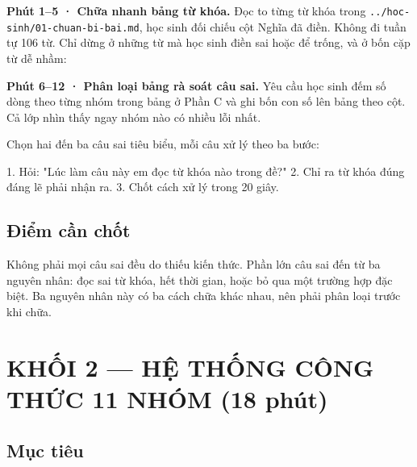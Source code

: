 \documentclass[11pt, a4paper]{article}
\begin{document}
\textbf{Phút 1–5 · Chữa nhanh bảng từ khóa.} Đọc to từng từ khóa trong \texttt{../hoc-sinh/01-chuan-bi-bai.md}, học sinh đối chiếu cột Nghĩa đã điền. Không đi tuần tự 106 từ. Chỉ dừng ở những từ mà học sinh điền sai hoặc để trống, và ở bốn cặp từ dễ nhầm:


\textbf{Phút 6–12 · Phân loại bảng rà soát câu sai.} Yêu cầu học sinh đếm số dòng theo từng nhóm trong bảng ở Phần C và ghi bốn con số lên bảng theo cột. Cả lớp nhìn thấy ngay nhóm nào có nhiều lỗi nhất.

Chọn hai đến ba câu sai tiêu biểu, mỗi câu xử lý theo ba bước:

1. Hỏi: "Lúc làm câu này em đọc từ khóa nào trong đề?"
2. Chỉ ra từ khóa đúng đáng lẽ phải nhận ra.
3. Chốt cách xử lý trong 20 giây.

\subsection{Điểm cần chốt}

Không phải mọi câu sai đều do thiếu kiến thức. Phần lớn câu sai đến từ ba nguyên nhân: đọc sai từ khóa, hết thời gian, hoặc bỏ qua một trường hợp đặc biệt. Ba nguyên nhân này có ba cách chữa khác nhau, nên phải phân loại trước khi chữa.

\section{KHỐI 2 — HỆ THỐNG CÔNG THỨC 11 NHÓM (18 phút)}

\subsection{Mục tiêu}
\end{document}
